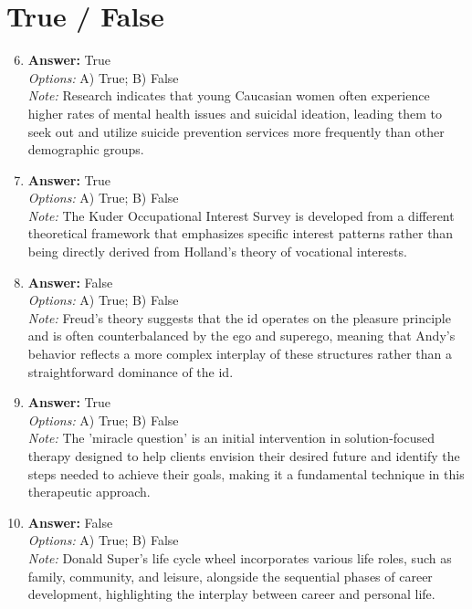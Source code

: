 \documentclass[12pt]{article}
\begin{document}
\section*{True / False}
\begin{enumerate}[label=\arabic*.]
\setcounter{enumi}{5}
\item \textbf{Answer:} True
\\ \textit{Options:} A) True; B) False
\\ \textit{Note:} Research indicates that young Caucasian women often experience higher rates of mental health issues and suicidal ideation, leading them to seek out and utilize suicide prevention services more frequently than other demographic groups.
\item \textbf{Answer:} True
\\ \textit{Options:} A) True; B) False
\\ \textit{Note:} The Kuder Occupational Interest Survey is developed from a different theoretical framework that emphasizes specific interest patterns rather than being directly derived from Holland's theory of vocational interests.
\item \textbf{Answer:} False
\\ \textit{Options:} A) True; B) False
\\ \textit{Note:} Freud's theory suggests that the id operates on the pleasure principle and is often counterbalanced by the ego and superego, meaning that Andy's behavior reflects a more complex interplay of these structures rather than a straightforward dominance of the id.
\item \textbf{Answer:} True
\\ \textit{Options:} A) True; B) False
\\ \textit{Note:} The 'miracle question' is an initial intervention in solution-focused therapy designed to help clients envision their desired future and identify the steps needed to achieve their goals, making it a fundamental technique in this therapeutic approach.
\item \textbf{Answer:} False
\\ \textit{Options:} A) True; B) False
\\ \textit{Note:} Donald Super's life cycle wheel incorporates various life roles, such as family, community, and leisure, alongside the sequential phases of career development, highlighting the interplay between career and personal life.
\end{enumerate}
\end{document}
